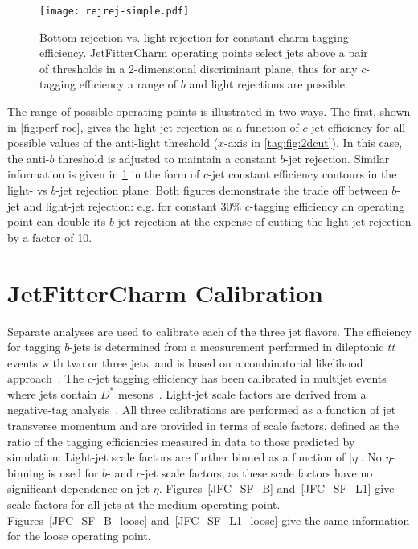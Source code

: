 \begin{figure}
  \begin{center}
    \texttt{[image: rejrej-simple.pdf]}
  \caption[Light and $b$ rejection for various $c$-tagging efficiencies]{
    Bottom rejection vs. light rejection for constant charm-tagging efficiency. JetFitterCharm operating points select jets above a pair of thresholds in a 2-dimensional discriminant plane, thus for any $c$-tagging efficiency a range of $b$ and light rejections are possible.}
  \label{fig:perf-iso}
  \end{center}
\end{figure}

The range of possible operating points is illustrated in two ways. The first, shown in \cref{fig:perf-roc}, gives the light-jet rejection as a function of $c$-jet efficiency for all possible values of the anti-light threshold ($x$-axis in \cref{tag:fig:2dcut}). In this case, the anti-$b$ threshold is adjusted to maintain a constant $b$-jet rejection. Similar information is given in \cref{fig:perf-iso} in the form of $c$-jet constant efficiency contours in the light- vs $b$-jet rejection plane. Both figures demonstrate the trade off between $b$-jet and light-jet rejection: e.g. for constant 30\% $c$-tagging efficiency an operating point can double its $b$-jet rejection at the expense of cutting the light-jet rejection by a factor of 10.



\section{JetFitterCharm Calibration}
\label{sec:calib}
Separate analyses are used to calibrate each of the three jet flavors.
The efficiency for tagging $b$-jets is determined from a measurement performed in dileptonic $t\bar{t}$ events with two or three jets, and is based on a combinatorial likelihood approach~\cite{Giacinto}.
The $c$-jet tagging efficiency has been calibrated in multijet events where jets contain $D^*$ mesons~\cite{bc2014}.
Light-jet scale factors are derived from a negative-tag analysis~\cite{bc2014}.
All three calibrations are performed as a function of jet transverse momentum and are provided in terms of scale factors, defined as the ratio of the tagging efficiencies measured in data to those predicted by simulation.
Light-jet scale factors are further binned as a function of $|\eta|$. No $\eta$-binning is used for $b$- and $c$-jet scale factors, as these scale factors have no significant dependence on jet $\eta$.
Figures~\ref{JFC_SF_B} and~\ref{JFC_SF_L1} give scale factors for all jets at the medium operating point. Figures~\ref{JFC_SF_B_loose} and~\ref{JFC_SF_L1_loose} give the same information for the loose operating point.

